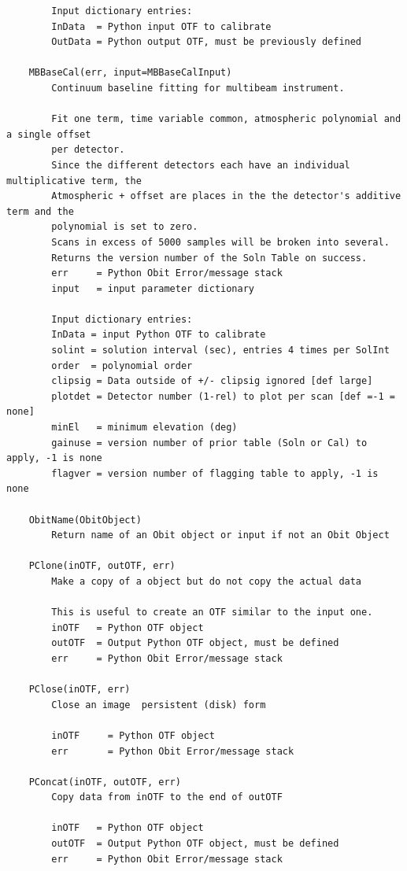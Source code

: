 \documentclass[11pt]{report}
\begin{document}
\begin{verbatim}
        Input dictionary entries:
        InData  = Python input OTF to calibrate
        OutData = Python output OTF, must be previously defined
    
    MBBaseCal(err, input=MBBaseCalInput)
        Continuum baseline fitting for multibeam instrument.
        
        Fit one term, time variable common, atmospheric polynomial and a single offset
        per detector.
        Since the different detectors each have an individual multiplicative term, the 
        Atmospheric + offset are places in the the detector's additive term and the
        polynomial is set to zero.
        Scans in excess of 5000 samples will be broken into several.
        Returns the version number of the Soln Table on success.
        err     = Python Obit Error/message stack
        input   = input parameter dictionary
        
        Input dictionary entries:
        InData = input Python OTF to calibrate
        solint = solution interval (sec), entries 4 times per SolInt
        order  = polynomial order
        clipsig = Data outside of +/- clipsig ignored [def large]
        plotdet = Detector number (1-rel) to plot per scan [def =-1 = none]
        minEl   = minimum elevation (deg)
        gainuse = version number of prior table (Soln or Cal) to apply, -1 is none
        flagver = version number of flagging table to apply, -1 is none
    
    ObitName(ObitObject)
        Return name of an Obit object or input if not an Obit Object
    
    PClone(inOTF, outOTF, err)
        Make a copy of a object but do not copy the actual data
        
        This is useful to create an OTF similar to the input one.
        inOTF   = Python OTF object
        outOTF  = Output Python OTF object, must be defined
        err     = Python Obit Error/message stack
    
    PClose(inOTF, err)
        Close an image  persistent (disk) form
        
        inOTF     = Python OTF object
        err       = Python Obit Error/message stack
    
    PConcat(inOTF, outOTF, err)
        Copy data from inOTF to the end of outOTF
        
        inOTF   = Python OTF object
        outOTF  = Output Python OTF object, must be defined
        err     = Python Obit Error/message stack
    

\end{verbatim}
\end{document}
